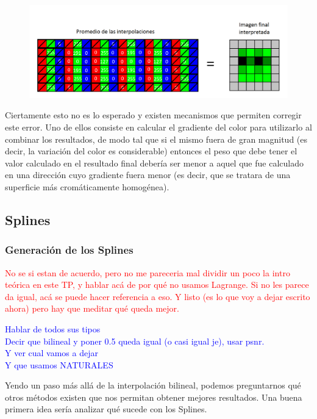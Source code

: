 \documentclass[a4paper]{article}
\begin{document}
\begin{figure}[h!]
	\caption{}
	\begin{center}
	\includegraphics[scale=0.36]{imagenes/apxl3}
	\label{apxl3}
  \end{center}
\end{figure}

Ciertamente esto no es lo esperado y existen mecanismos que permiten corregir este error. Uno de ellos consiste en calcular el gradiente del color para utilizarlo al combinar los resultados, de modo tal que si el mismo fuera de gran magnitud (es decir, la variación del color es considerable) entonces el peso que debe tener el valor calculado en el resultado final debería ser menor a aquel que fue calculado en una dirección cuyo gradiente fuera menor (es decir, que se tratara de una superficie más cromáticamente homogénea).



\pagebreak

\newpage
\subsection{Splines}
\subsubsection*{Generación de los Splines}
\textcolor{red}{No se si estan de acuerdo, pero no me pareceria mal dividir un poco la intro teórica en este TP, y hablar acá de por qué no usamos Lagrange. Si no les parece da igual, acá se puede hacer referencia a eso. Y listo (es lo que voy a dejar escrito ahora) pero hay que meditar qué queda mejor.}

\textcolor{blue}{Hablar de todos sus tipos\\
Decir que bilineal y poner 0.5 queda igual (o casi igual je), usar psnr.\\
Y ver cual vamos a dejar\\
Y que usamos NATURALES}

Yendo un paso más allá de la interpolación bilineal, podemos preguntarnos qué otros métodos existen que nos permitan obtener mejores resultados. Una buena primera idea sería analizar qué sucede con los Splines. \\
\end{document}
